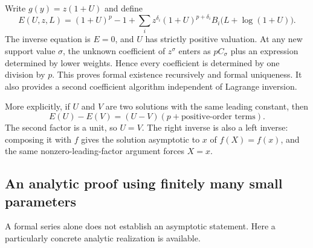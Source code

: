 \documentclass[11pt,a4paper]{article}
\numberwithin{equation}{section}
\theoremstyle{definition}
\theoremstyle{remark}
\begin{document}
Write $g(y)=z(1+U)$ and define
\begin{equation}
 E(U,z,L)=(1+U)^p-1+
 \sum_i z^{\delta_i}(1+U)^{p+\delta_i}
 B_i\bigl(L+\log(1+U)\bigr).
 \label{eq:normalized-equation}
\end{equation}
The inverse equation is $E=0$, and $U$ has strictly positive valuation.
At any new support value $\sigma$, the unknown coefficient of
$z^\sigma$ enters as $pC_\sigma$ plus an expression determined by lower
weights. Hence every coefficient is determined by one division by $p$.
This proves formal existence recursively and formal uniqueness. It also
provides a second coefficient algorithm independent of Lagrange inversion.

More explicitly, if $U$ and $V$ are two solutions with the same leading
constant, then
\[
 E(U)-E(V)=(U-V)(p+\text{positive-order terms}).
\]
The second factor is a unit, so $U=V$. The right inverse is also a left
inverse: composing it with $f$ gives the solution asymptotic to $x$ of
$f(X)=f(x)$, and the same nonzero-leading-factor argument forces $X=x$.

\subsection{An analytic proof using finitely many small parameters}

A formal series alone does not establish an asymptotic statement. Here a
particularly concrete analytic realization is available.
\end{document}
